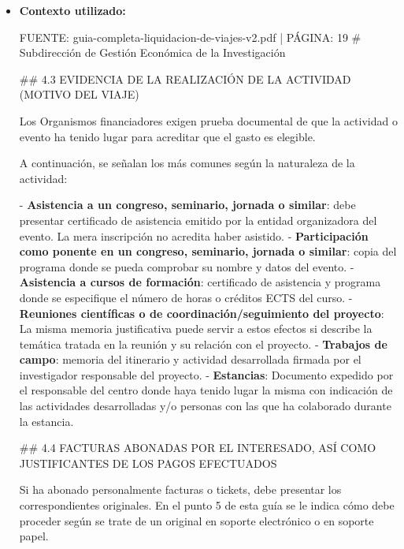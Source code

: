 \documentclass{article}
\begin{document}
\begin{itemize}
\begin{itemize}
                Recuerda que es importante seguir las instrucciones y requisitos establecidos en la \textbf{Guía completa de liquidación de viajes} y en la \textbf{Miniguía para viajes por razón del servicio} para asegurarte de que el trámite se realice de manera correcta y eficiente.
          \item \textbf{Contexto utilizado:}
                \begin{scriptsize}
                  FUENTE: guia-completa-liquidacion-de-viajes-v2.pdf | PÁGINA: 19
                  \# Subdirección de Gestión Económica de la Investigación

                  \#\# 4.3 EVIDENCIA DE LA REALIZACIÓN DE LA ACTIVIDAD (MOTIVO DEL VIAJE)

                  Los Organismos financiadores exigen prueba documental de que la actividad o evento ha tenido lugar para acreditar que el gasto es elegible.

                  A continuación, se señalan los más comunes según la naturaleza de la actividad:

                  - \textbf{Asistencia a un congreso, seminario, jornada o similar}: debe presentar certificado de asistencia emitido por la entidad organizadora del evento. La mera inscripción no acredita haber asistido.
                  - \textbf{Participación como ponente en un congreso, seminario, jornada o similar}: copia del programa donde se pueda comprobar su nombre y datos del evento.
                  - \textbf{Asistencia a cursos de formación}: certificado de asistencia y programa donde se especifique el número de horas o créditos ECTS del curso.
                  - \textbf{Reuniones científicas o de coordinación/seguimiento del proyecto}: La misma memoria justificativa puede servir a estos efectos si describe la temática tratada en la reunión y su relación con el proyecto.
                  - \textbf{Trabajos de campo}: memoria del itinerario y actividad desarrollada firmada por el investigador responsable del proyecto.
                  - \textbf{Estancias}: Documento expedido por el responsable del centro donde haya tenido lugar la misma con indicación de las actividades desarrolladas y/o personas con las que ha colaborado durante la estancia.

                  \#\# 4.4 FACTURAS ABONADAS POR EL INTERESADO, ASÍ COMO JUSTIFICANTES DE LOS PAGOS EFECTUADOS

                  Si ha abonado personalmente facturas o tickets, debe presentar los correspondientes originales. En el punto 5 de esta guía se le indica cómo debe proceder según se trate de un original en soporte electrónico o en soporte papel.


\end{scriptsize}
\end{itemize}
\end{itemize}
\end{document}
